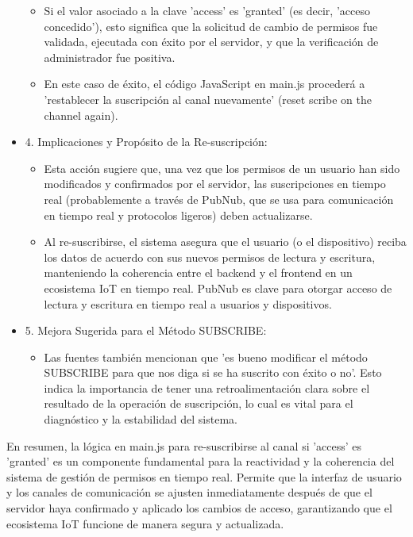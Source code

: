\documentclass{report}
\begin{document}
\begin{itemize}
        \begin{itemize}
            \item Si el valor asociado a la clave 'access' es 'granted' (es decir, 'acceso concedido'), esto significa que la solicitud de cambio 
            de permisos fue validada, ejecutada con éxito por el servidor, y que la verificación de administrador fue positiva.
            \item En este caso de éxito, el código JavaScript en main.js procederá a 'restablecer la suscripción al canal nuevamente' 
            (reset scribe on the channel again).
        \end{itemize}
    \item 4. Implicaciones y Propósito de la Re-suscripción:
        \begin{itemize}
            \item Esta acción sugiere que, una vez que los permisos de un usuario han sido modificados y confirmados por el servidor, las 
            suscripciones en tiempo real (probablemente a través de PubNub, que se usa para comunicación en tiempo real y protocolos ligeros) 
            deben actualizarse.
            \item Al re-suscribirse, el sistema asegura que el usuario (o el dispositivo) reciba los datos de acuerdo con sus nuevos permisos 
            de lectura y escritura, manteniendo la coherencia entre el backend y el frontend en un ecosistema IoT en tiempo real. PubNub es clave 
            para otorgar acceso de lectura y escritura en tiempo real a usuarios y dispositivos.
        \end{itemize}
    \item 5. Mejora Sugerida para el Método SUBSCRIBE:
        \begin{itemize}
            \item Las fuentes también mencionan que 'es bueno modificar el método SUBSCRIBE para que nos diga si se ha suscrito con éxito o no'. 
            Esto indica la importancia de tener una retroalimentación clara sobre el resultado de la operación de suscripción, lo cual es vital 
            para el diagnóstico y la estabilidad del sistema.
        \end{itemize}
\end{itemize}
En resumen, la lógica en main.js para re-suscribirse al canal si 'access' es 'granted' es un componente fundamental para la reactividad y 
la coherencia del sistema de gestión de permisos en tiempo real. Permite que la interfaz de usuario y los canales de comunicación se ajusten 
inmediatamente después de que el servidor haya confirmado y aplicado los cambios de acceso, garantizando que el ecosistema IoT funcione de 
manera segura y actualizada.
\end{document}
